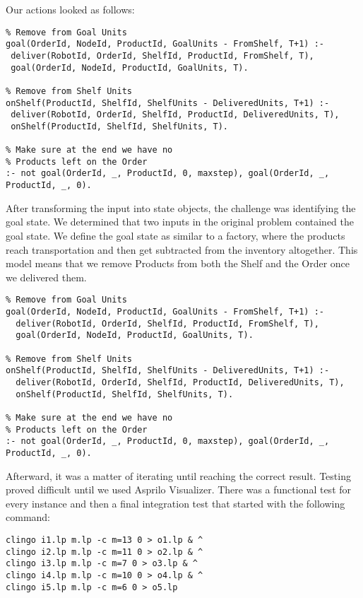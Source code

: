 \documentclass[letterpaper]{article} %
\begin{document}
Our actions looked as follows:

\begin{lstlisting}[numbers=none,language=clingo]
% Effect of delivering a product
% Remove from Goal Units
goal(OrderId, NodeId, ProductId, GoalUnits - FromShelf, T+1) :-
 deliver(RobotId, OrderId, ShelfId, ProductId, FromShelf, T),
 goal(OrderId, NodeId, ProductId, GoalUnits, T).
  
% Remove from Shelf Units
onShelf(ProductId, ShelfId, ShelfUnits - DeliveredUnits, T+1) :- 
 deliver(RobotId, OrderId, ShelfId, ProductId, DeliveredUnits, T),
 onShelf(ProductId, ShelfId, ShelfUnits, T).
 
% Make sure at the end we have no 
% Products left on the Order
:- not goal(OrderId, _, ProductId, 0, maxstep), goal(OrderId, _, ProductId, _, 0).
\end{lstlisting}
  

After transforming the input into state objects, the challenge was identifying the goal state. We determined that two inputs in the original problem contained the goal state. We define the goal state as similar to a factory, where the products reach transportation and then get subtracted from the inventory altogether. This model means that we remove Products from both the Shelf and the Order once we delivered them.

\begin{lstlisting}[numbers=none,language=clingo]
% Effect of delivering a product
% Remove from Goal Units
goal(OrderId, NodeId, ProductId, GoalUnits - FromShelf, T+1) :-
  deliver(RobotId, OrderId, ShelfId, ProductId, FromShelf, T),
  goal(OrderId, NodeId, ProductId, GoalUnits, T).

% Remove from Shelf Units
onShelf(ProductId, ShelfId, ShelfUnits - DeliveredUnits, T+1) :- 
  deliver(RobotId, OrderId, ShelfId, ProductId, DeliveredUnits, T),
  onShelf(ProductId, ShelfId, ShelfUnits, T).

% Make sure at the end we have no 
% Products left on the Order
:- not goal(OrderId, _, ProductId, 0, maxstep), goal(OrderId, _, ProductId, _, 0).
\end{lstlisting}

Afterward, it was a matter of iterating until reaching the correct result. Testing proved difficult until we used Asprilo Visualizer.  There was a functional test for every instance and then a final integration test that started with the following command:

\begin{lstlisting}[numbers=none]
clingo i1.lp m.lp -c m=13 0 > o1.lp & ^
clingo i2.lp m.lp -c m=11 0 > o2.lp & ^
clingo i3.lp m.lp -c m=7 0 > o3.lp & ^
clingo i4.lp m.lp -c m=10 0 > o4.lp & ^
clingo i5.lp m.lp -c m=6 0 > o5.lp
\end{lstlisting}
\end{document}
